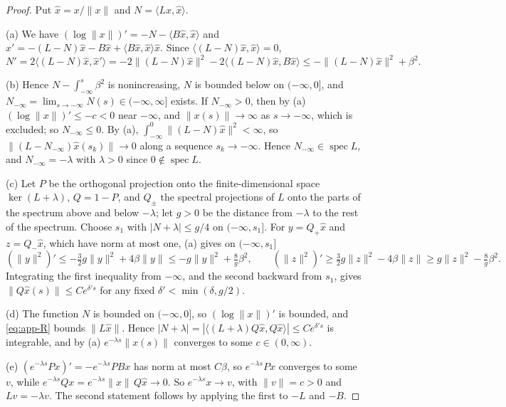 \documentclass[11pt]{amsart}
\theoremstyle{definition}
\theoremstyle{remark}
\theoremstyle{plain}
\numberwithin{equation}{section}
\begin{document}
\begin{proof}
Put $\hat x=x/\|x\|$ and $N=\langle L\hat x,\hat x\rangle$.

(a) We have $(\log\|x\|)'=-N-\langle B\hat x,\hat x\rangle$ and
$\hat x'=-(L-N)\hat x-B\hat x+\langle B\hat x,\hat x\rangle\hat x$. Since
$\langle(L-N)\hat x,\hat x\rangle=0$,
\[
N'=2\langle(L-N)\hat x,\hat x'\rangle=-2\|(L-N)\hat x\|^2-2\langle(L-N)\hat x,B\hat x\rangle
\le-\|(L-N)\hat x\|^2+\beta^2 .
\]

(b) Hence $N-\int_{-\infty}^s\beta^2$ is nonincreasing, $N$ is bounded below on $(-\infty,0]$,
and $N_{-\infty}=\lim_{s\to-\infty}N(s)\in(-\infty,\infty]$ exists. If $N_{-\infty}>0$, then by
(a) $(\log\|x\|)'\le-c<0$ near $-\infty$, and $\|x(s)\|\to\infty$ as $s\to-\infty$, which is
excluded; so $N_{-\infty}\le0$. By (a), $\int_{-\infty}^0\|(L-N)\hat x\|^2<\infty$, so
$\|(L-N_{-\infty})\hat x(s_k)\|\to0$ along a sequence $s_k\to-\infty$. Hence
$N_{-\infty}\in\operatorname{spec}L$, and $N_{-\infty}=-\lambda$ with $\lambda>0$ since
$0\notin\operatorname{spec}L$.

(c) Let $P$ be the orthogonal projection onto the finite-dimensional space $\ker(L+\lambda)$,
$Q=1-P$, and $Q_\pm$ the spectral projections of $L$ onto the parts of the spectrum above and
below $-\lambda$; let $g>0$ be the distance from $-\lambda$ to the rest of the spectrum. Choose
$s_1$ with $|N+\lambda|\le g/4$ on $(-\infty,s_1]$. For $y=Q_+\hat x$ and $z=Q_-\hat x$, which
have norm at most one, (a) gives on $(-\infty,s_1]$
\[
(\|y\|^2)'\le-\tfrac32g\|y\|^2+4\beta\|y\|\le-g\|y\|^2+\tfrac8g\beta^2,\qquad
(\|z\|^2)'\ge\tfrac32g\|z\|^2-4\beta\|z\|\ge g\|z\|^2-\tfrac8g\beta^2 .
\]
Integrating the first inequality from $-\infty$, and the second backward from $s_1$, gives
$\|Q\hat x(s)\|\le Ce^{\delta's}$ for any fixed $\delta'<\min(\delta,g/2)$.

(d) The function $N$ is bounded on $(-\infty,0]$, so $(\log\|x\|)'$ is bounded, and
\eqref{eq:app-R} bounds $\|L\hat x\|$. Hence
$|N+\lambda|=|\langle(L+\lambda)Q\hat x,Q\hat x\rangle|\le Ce^{\delta's}$ is integrable, and by (a)
$e^{-\lambda s}\|x(s)\|$ converges to some $c\in(0,\infty)$.

(e) $(e^{-\lambda s}Px)'=-e^{-\lambda s}PBx$ has norm at most $C\beta$, so $e^{-\lambda s}Px$
converges to some $v$, while $e^{-\lambda s}Qx=e^{-\lambda s}\|x\|\,Q\hat x\to0$. So
$e^{-\lambda s}x\to v$, with $\|v\|=c>0$ and $Lv=-\lambda v$. The second statement follows by
applying the first to $-L$ and $-B$.
\end{proof}
\end{document}
